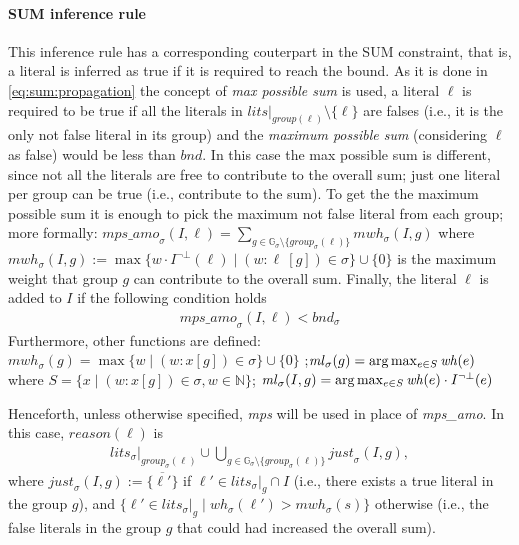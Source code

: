 \paragraph{SUM inference rule} 
This inference rule has a corresponding couterpart in the SUM constraint, that is,
a literal is inferred as true if it is required to reach the bound.
As it is done in \eqref{eq:sum:propagation} the concept of \textit{max possible sum} is used, a literal  $\ell$ is required to be true if all the literals 
in $\mathit{lits}|_{group(\ell)} \setminus \{ \ell \}$ are 
falses (i.e., it is the only not false literal in its group) and 
the \textit{maximum possible sum} (considering $\ell$ as false) would be less than $\mathit{bnd}$.
In this case the max possible sum is different, since not all the literals are free to contribute to the overall 
sum; just one literal per group can be true (i.e., contribute to the sum).
To get the the maximum possible sum it is enough to pick the maximum not false literal from each group;
more formally: $\mathit{mps\_amo}_{\sigma}(I,\ell) = \sum_{g \in \mathbb{G}_\sigma \setminus
\{\mathit{group}_\sigma(\ell)\}}{\mathit{mwh}_\sigma(I,g)}$ 
where $\mathit{mwh}_\sigma(I,g) := \max\{w \cdot I^{\neg\bot}(\ell) \mid (w : \ell\ [g]) \in \sigma\} \cup \{0\}$ 
is the maximum weight that group $g$ can contribute to the overall sum. 
Finally, the literal $\ell$ is added to $I$ if the following condition holds 
\begin{align}\label{eq:amosum:propagation:2}
    \mathit{mps\_amo}_{\sigma}(I,\ell) < \mathit{bnd}_\sigma
\end{align}
Furthermore, other functions are defined:\\$\mathit{mwh}_{\sigma}(g) = 
\max\{ w \mid (w : x [g]) \in \sigma \} \cup \{0\} $
;$\mathit{ml}_{\sigma}(g) =  
\arg \max_{e \in S} \mathit{wh}(e)$ 
where $S = \{x \mid (w : x [g]) \in \sigma, w \in \mathbb{N}\}$;
$\mathit{ml}_{\sigma}(I,g) =  
\arg \max_{e \in S} \mathit{wh}(e) \cdot I^{\neg\bot}(e)$

Henceforth, unless otherwise specified, \textit{mps} will be used in place of \textit{mps\_amo}.
In this case, $\mathit{reason}(\ell)$ is
\begin{align}\label{eq:amosum:reason:2}
\mathit{lits}_\sigma|_{\mathit{group}_\sigma(\ell)} \cup 
\bigcup_{g \in \mathbb{G}_\sigma \setminus \{\mathit{group}_\sigma(\ell)\}}{
    \mathit{just}_\sigma(I,g)
},
\end{align}
where 
$\mathit{just}_\sigma(I,g) := \{\overline{\ell'}\}$ if $\ell' \in \mathit{lits}_\sigma|_g \cap I$ 
(i.e., there exists a true literal in the group $g$), and
$\{\ell' \in \mathit{lits}_\sigma|_g \mid \mathit{wh}_\sigma(\ell') > \mathit{mwh}_\sigma(s)\}$ 
otherwise (i.e., the false literals in the group $g$ that could had increased the overall sum).

